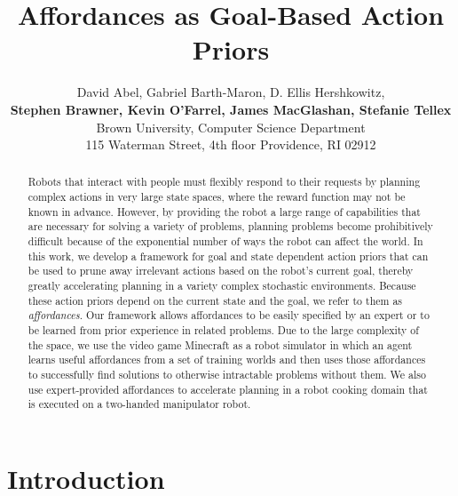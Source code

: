 \documentclass[letterpaper]{article}
\begin{document}
\title{Affordances as Goal-Based Action Priors}

\author{David Abel, Gabriel Barth-Maron, D. Ellis Hershkowitz, \\ {\Large {\bf Stephen Brawner, Kevin O'Farrel, James MacGlashan, Stefanie Tellex}}\\
Brown University, Computer Science Department\\
115 Waterman Street, 4th floor
Providence, RI 02912
}

\maketitle

\begin{abstract}
Robots that interact with people must flexibly respond to their
requests by planning complex actions in very large state spaces, where
the reward function may not be known in advance.  However, by
providing the robot a large range of capabilities that are necessary
for solving a variety of problems, planning problems become
prohibitively difficult because of the exponential number of ways the
robot can affect the world.  In this work, we develop a framework for
goal and state dependent action priors that can be used to prune away
irrelevant actions based on the robot's current goal, thereby greatly
accelerating planning in a variety complex stochastic environments.
Because these action priors depend on the current state and the goal,
we refer to them as {\em affordances}.  Our framework allows
affordances to be easily specified by an expert or to be learned from
prior experience in related problems. Due to the large complexity of
the space, we use the video game Minecraft as a robot simulator in
which an agent learns useful affordances from a set of training
worlds and then uses those affordances to successfully find solutions to
otherwise intractable problems without them. We also use
expert-provided affordances to accelerate planning in a robot cooking
domain that is executed on a two-handed manipulator robot.
\end{abstract}


\section{Introduction}
\label{sec:introduction}
\end{document}
